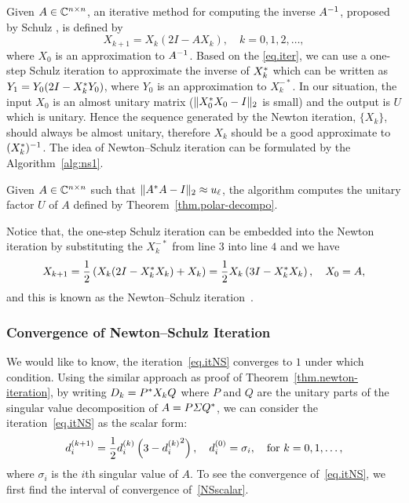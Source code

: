 Given $A\in\mathbb{C}^{n\times n}$, an iterative method for computing the inverse $A^{-1}$, proposed by Schulz , is defined by 
\begin{equation}
    \label{eq.schuiter}
    X_{k+1} = X_{k}(2I - AX_k), \quad k = 0,1,2,\dots,
\end{equation}
where $X_0$ is an approximation to $A^{-1}$. Based on the \eqref{eq.iter}, we can use a one-step Schulz iteration to approximate the inverse of $X_k^*$ which can be written as $Y_1 = Y_0(2I - X_k^* Y_0)$, where $Y_0$ is an approximation to $X_k^{-*}$. In our situation, the input $X_0$ is an almost unitary matrix ($\|{X_0^* X_0 - I}\|_2$ is small) and the output is $U$ which is unitary. Hence the sequence generated by the Newton iteration, $\{X_k\}$, should always be almost unitary, therefore $X_k$ should be a good approximate to $(X_k^*)^{-1}$. The idea of Newton--Schulz iteration can be formulated by the Algorithm~\ref{alg:ns1}.
\begin{algorithm}[ht]
\caption{Given $A\in\mathbb{C}^{n\times n}$ such that $\|{A^* A - I}\|_2 \approx u_\ell$, the algorithm computes the unitary factor $U$ of $A$ defined by Theorem~\ref{thm.polar-decompo}.}
\label{alg:ns1}
\begin{algorithmic}[1]
         
         
    \EndFor
\end{algorithmic}
\end{algorithm}

Notice that, the one-step Schulz iteration can be embedded into the Newton iteration by substituting the $X_k^{-*}$ from line $3$ into line $4$ and we have 
\begin{equation}\label{eq.itNS}
    X_{k+1} = \frac{1}{2}\left(X_k(2I - X_k^* X_k) + X_k\right) = \frac 12 X_k\left(3I - X_k^* X_k\right), \quad X_0 = A,
\end{equation}
and this is known as the Newton--Schulz iteration~.

\subsubsection{Convergence of Newton--Schulz Iteration}

We would like to know, the iteration~\eqref{eq.itNS} converges to $1$ under which condition. Using the similar approach as proof of Theorem~\ref{thm.newton-iteration}, by writing $D_k = P^* X_k Q$ where $P$ and $Q$ are the unitary parts of the singular value decomposition of $A = P\varSigma Q^*$, we can consider the iteration~\eqref{eq.itNS} as the scalar form:
\begin{equation}\label{NSscalar}
    d_i^{(k+1)} = \frac 12 d_i^{(k)}\left(3-{d_i^{(k)}}^2\right),\quad d_i^{(0)} = \sigma_i,\quad \text{for $k=0,1,\dots,$}
\end{equation}
where $\sigma_i$ is the $i$th singular value of $A$. To see the convergence of~\eqref{eq.itNS}, we first find the interval of convergence of~\eqref{NSscalar}.

